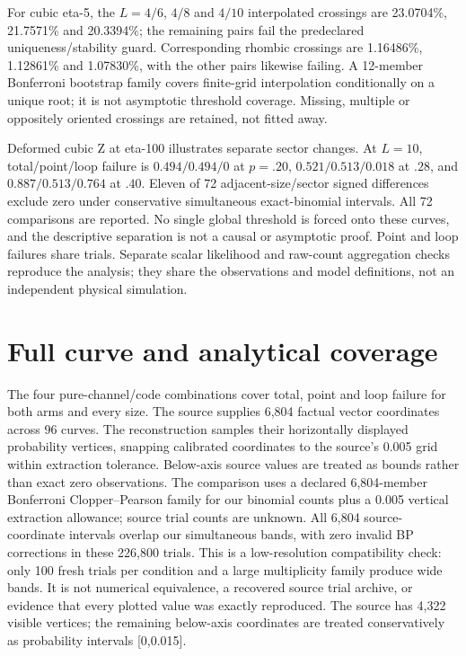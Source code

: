 For cubic eta-5, the $L=4/6$, $4/8$ and $4/10$ interpolated crossings are 23.0704\%, 21.7571\% and 20.3394\%; the remaining pairs fail the predeclared uniqueness/stability guard. Corresponding rhombic crossings are 1.16486\%, 1.12861\% and 1.07830\%, with the other pairs likewise failing. A 12-member Bonferroni bootstrap family covers finite-grid interpolation conditionally on a unique root; it is not asymptotic threshold coverage. Missing, multiple or oppositely oriented crossings are retained, not fitted away.

Deformed cubic Z at eta-100 illustrates separate sector changes. At $L=10$, total/point/loop failure is $0.494/0.494/0$ at $p=.20$, $0.521/0.513/0.018$ at $.28$, and $0.887/0.513/0.764$ at $.40$. Eleven of 72 adjacent-size/sector signed differences exclude zero under conservative simultaneous exact-binomial intervals. All 72 comparisons are reported. No single global threshold is forced onto these curves, and the descriptive separation is not a causal or asymptotic proof. Point and loop failures share trials. Separate scalar likelihood and raw-count aggregation checks reproduce the analysis; they share the observations and model definitions, not an independent physical simulation.

\section{Full curve and analytical coverage}
The four pure-channel/code combinations cover total, point and loop failure for both arms and every size. The source supplies 6,804 factual vector coordinates across 96 curves. The reconstruction samples their horizontally displayed probability vertices, snapping calibrated coordinates to the source's 0.005 grid within extraction tolerance. Below-axis source values are treated as bounds rather than exact zero observations. The comparison uses a declared 6,804-member Bonferroni Clopper--Pearson family for our binomial counts plus a 0.005 vertical extraction allowance; source trial counts are unknown. All 6,804 source-coordinate intervals overlap our simultaneous bands, with zero invalid BP corrections in these 226,800 trials. This is a low-resolution compatibility check: only 100 fresh trials per condition and a large multiplicity family produce wide bands. It is not numerical equivalence, a recovered source trial archive, or evidence that every plotted value was exactly reproduced. The source has 4,322 visible vertices; the remaining below-axis coordinates are treated conservatively as probability intervals [0,0.015].

